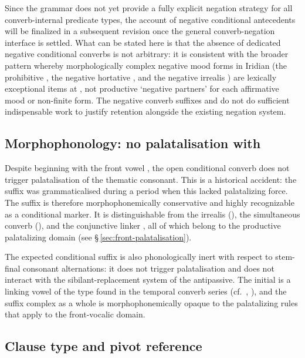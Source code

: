 Since the grammar does not yet provide a fully explicit negation strategy
for all converb-internal predicate types, the account of negative
conditional antecedents will be finalized in a subsequent revision once
the general converb-negation interface is settled. What can be stated
here is that the absence of dedicated negative conditional converbs is
not arbitrary: it is consistent with the broader pattern whereby
morphologically complex negative mood forms in Iridian (the prohibitive
, the negative hortative , and the negative irrealis
) are lexically exceptional items at , not productive
`negative partners' for each affirmative mood or non-finite form.
The negative converb suffixes  and  do not do
sufficient indispensable work to justify retention alongside the
existing negation system.

\subsection{Morphophonology: no palatalisation with }\label{sec:cond-nopala}

Despite beginning with the front vowel , the open conditional
converb  does not trigger palatalisation of the thematic
consonant. This is a historical accident: the suffix was grammaticalised
during a period when this  lacked palatalizing force. The
suffix is therefore morphophonemically conservative and highly
recognizable as a conditional marker. It is distinguishable from the
irrealis (), the simultaneous converb (), and the
conjunctive linker , all of which belong to the productive
palatalizing domain (see §\,\ref{sec:front-palatalisation}).

The expected conditional suffix  is also phonologically inert
with respect to stem-final consonant alternations: it does not trigger
palatalisation and does not interact with the sibilant-replacement system
of the antipassive. The initial  is a linking vowel of the type
found in the temporal converb series (cf.\ , ),
and the suffix complex as a whole is morphophonemically opaque to the
palatalizing rules that apply to the front-vocalic domain.

\subsection{Clause type and pivot reference}\label{sec:cond-subj}

